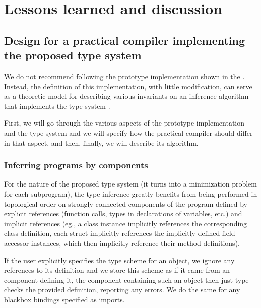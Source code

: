 \chapter{Lessons learned and discussion}
\label{chap5}

\section{Design for a practical compiler implementing the proposed type system}
\label{new_approach}

We do not recommend following the prototype implementation shown in the . Instead, the definition of this implementation, with little modification, can serve as a theoretic model for describing various invariants on an inference algorithm that implements the type system .

First, we will go through the various aspects of the prototype implementation and the type system and we will specify how the practical compiler should differ in that aspect, and then, finally, we will describe its algorithm.

\subsection{Inferring programs by components}

For the nature of the proposed type system (it turns into a minimization problem for each subprogram), the type inference greatly benefits from being performed in topological order on strongly connected components of the program defined by explicit references (function calls, types in declarations of variables, etc.) and implicit references (eg., a class instance implicitly references the corresponding class definition, each struct implicitly references the implicitly defined field accessor instances, which then implicitly reference their method definitions).

\begin{remark}
    If the user explicitly specifies the type scheme for an object, we ignore any references to its definition and we store this scheme as if it came from an component defining it, the component containing such an object then just type-checks the provided definition, reporting any errors. We do the same for any blackbox bindings specified as imports.
\end{remark}

